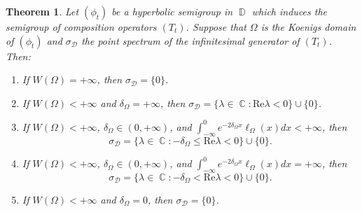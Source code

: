 \documentclass[10pt,a4paper]{amsart}
\newtheorem{theorem}{Theorem}
\DeclareMathOperator{\C}{\mathbb{C}}
\DeclareMathOperator{\D}{\mathbb{D}}
\begin{document}
	\begin{theorem}\label{thm:intro hyperbolic dirichlet}
		Let $(\phi_t)$ be a hyperbolic semigroup in $\D$ which induces the semigroup of composition operators $(T_t)$. Suppose that $\Omega$ is the Koenigs domain of $(\phi_t)$ and $\sigma_\mathcal{D}$ the point spectrum of the infinitesimal generator of $(T_t)$. Then:
		\begin{enumerate}
			\item[\textup{(a)}] If $W(\Omega)=+\infty$, then $\sigma_{\mathcal{D}}=\{0\}$.
			\item[\textup{(b)}] If $W(\Omega)<+\infty$ and $\delta_\Omega=+\infty$, then $\sigma_{\mathcal{D}}=\{\lambda\in\C:\mathrm{Re}\lambda<0\}\cup\{0\}$.
			\item[\textup{(c)}] If $W(\Omega)<+\infty$, $\delta_\Omega\in(0,+\infty)$, and $\int_{-\infty}^{0}e^{-2\delta_\Omega x}\ell_\Omega(x)dx<+\infty$, then
			$$\sigma_{\mathcal{D}}=\{\lambda\in\C:-\delta_\Omega\le\mathrm{Re}\lambda<0\}\cup\{0\}.$$
			\item[\textup{(d)}] If $W(\Omega)<+\infty$, $\delta_\Omega\in(0,+\infty)$, and $\int_{-\infty}^{0}e^{-2\delta_\Omega x}\ell_\Omega(x)dx=+\infty$, then
			$$\sigma_{\mathcal{D}}=\{\lambda\in\C:-\delta_\Omega<\mathrm{Re}\lambda<0\}\cup\{0\}.$$
			\item [\textup{(e)}] If $W(\Omega)<+\infty$ and $\delta_\Omega=0$, then $\sigma_{\mathcal{D}}=\{0\}$.
		\end{enumerate}
	\end{theorem}
\end{document}
